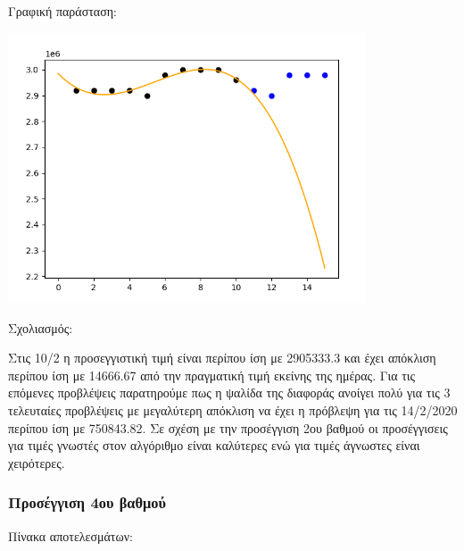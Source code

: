 \documentclass[a4paper,11pt]{article}
\begin{document}
	\hfill \break
	
	Γραφική παράσταση:
	
	\includegraphics[height=8cm]{karel-3-alt.png}
	
	Σχολιασμός:
	\hfill \break
	
	Στις 10/2 η προσεγγιστική τιμή είναι περίπου ίση με 2905333.3 και έχει απόκλιση περίπου ίση με 14666.67 από την πραγματική τιμή εκείνης της ημέρας. Για τις επόμενες προβλέψεις
	παρατηρούμε πως η ψαλίδα της διαφοράς ανοίγει πολύ για τις 3 τελευταίες προβλέψεις με μεγαλύτερη απόκλιση να έχει η πρόβλεψη για τις 14/2/2020 περίπου ίση με 750843.82. Σε σχέση με την προσέγγιση 2ου βαθμού οι προσέγγισεις για τιμές γνωστές στον αλγόριθμο είναι καλύτερες ενώ για τιμές άγνωστες είναι χειρότερες.
	
	

	\subsubsection{Προσέγγιση 4ου βαθμού}
	
	Πίνακα αποτελεσμάτων:
\end{document}
